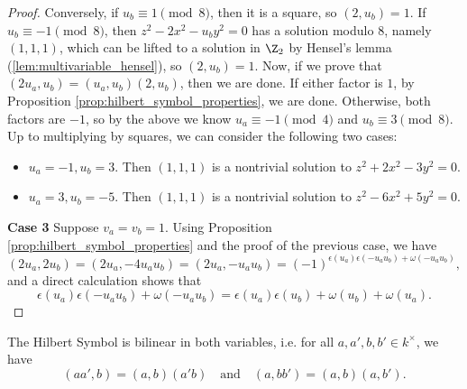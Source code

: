\begin{proof}
		Conversely, if $u_b \equiv 1 \pmod 8$, then it is a square, so $(2, u_b)=1$.
		If $u_b \equiv -1 \pmod 8$, then $z^2-2x^2-u_by^2=0$ has a solution modulo $8$, namely $(1,1,1)$,
		which can be lifted to a solution in $\Z_2$ by Hensel's lemma (\ref{lem:multivariable_hensel}),
		so $(2, u_b)=1$. Now, if we prove that $(2u_a,u_b)=(u_a,u_b)(2,u_b)$, then we are done. If either
		factor is $1$, by Proposition \ref{prop:hilbert_symbol_properties}, we are done. Otherwise, both
		factors are $-1$, so by the above we know $u_a \equiv -1 \pmod 4$ and $u_b \equiv 3 \pmod 8$. Up
		to multiplying by squares, we can consider the following two cases:
		\begin{itemize}
			\item $u_a=-1,u_b=3$. Then $(1,1,1)$ is a nontrivial solution to $z^2+2x^2-3y^2=0$.
			\item $u_a=3,u_b=-5$. Then $(1,1,1)$ is a nontrivial solution to $z^2-6x^2+5y^2=0$.
		\end{itemize}

		\noindent\textbf{Case 3} Suppose $v_a=v_b=1$. Using Proposition \ref{prop:hilbert_symbol_properties} and the proof
		of the previous case, we have
		\[
		(2u_a,2u_b)=(2u_a,-4u_au_b)=(2u_a,-u_au_b)=(-1)^{\epsilon(u_a)\epsilon(-u_au_b)+\omega(-u_au_b)},
		\]
		and a direct calculation shows that
		\[
		\epsilon(u_a)\epsilon(-u_au_b)+\omega(-u_au_b) = \epsilon(u_a)\epsilon(u_b) + \omega(u_b) + \omega(u_a).
		\]
\end{proof}

\begin{theorem}
		\label{thm:bilinear}
		\leanok
The Hilbert Symbol is bilinear in both variables, i.e. for all $a, a', b, b' \in k^\times$, we have
\[
(aa',b)=(a,b)(a'b) \quad \text{and} \quad (a,bb')=(a,b)(a,b').
\]
\end{theorem}


